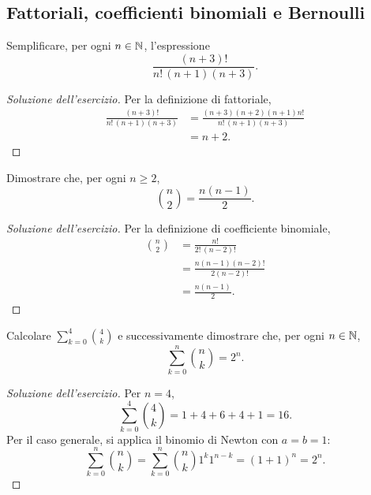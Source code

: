 \subsection{Fattoriali, coefficienti binomiali e Bernoulli}
\label{sec:esercizi-fondamenti-fattoriali-binomiali-bernoulli}

\begin{exercise}
\label{ex:fondamenti-semplificazione-fattoriali}
Semplificare, per ogni $n\in\mathbb{N}$, l'espressione
\[
  \frac{(n+3)!}{n!\,(n+1)(n+3)}.
\]
\end{exercise}
\begin{proof}[Soluzione dell'esercizio]
Per la definizione di fattoriale,
\[
\begin{aligned}
  \frac{(n+3)!}{n!\,(n+1)(n+3)}
    &=\frac{(n+3)(n+2)(n+1)n!}{n!\,(n+1)(n+3)}\\
    &=n+2.
\end{aligned}
\]
\end{proof}

\begin{exercise}
\label{ex:fondamenti-coefficiente-binomiale-due}
Dimostrare che, per ogni $n\ge2$,
\[
  \binom{n}{2}=\frac{n(n-1)}{2}.
\]
\end{exercise}
\begin{proof}[Soluzione dell'esercizio]
Per la definizione di coefficiente binomiale,
\[
\begin{aligned}
  \binom{n}{2}
    &=\frac{n!}{2!\,(n-2)!}\\
    &=\frac{n(n-1)(n-2)!}{2(n-2)!}\\
    &=\frac{n(n-1)}{2}.
\end{aligned}
\]
\end{proof}

\begin{exercise}
\label{ex:fondamenti-somma-coefficienti-binomiali}
Calcolare $\sum_{k=0}^{4}\binom{4}{k}$ e successivamente dimostrare
che, per ogni $n\in\mathbb{N}$,
\[
  \sum_{k=0}^{n}\binom{n}{k}=2^n.
\]
\end{exercise}
\begin{proof}[Soluzione dell'esercizio]
Per $n=4$,
\[
  \sum_{k=0}^{4}\binom{4}{k}=1+4+6+4+1=16.
\]
Per il caso generale, si applica il binomio di Newton con $a=b=1$:
\[
  \sum_{k=0}^{n}\binom{n}{k}
    =\sum_{k=0}^{n}\binom{n}{k}1^k1^{n-k}
    =(1+1)^n=2^n.
\]
\end{proof}

